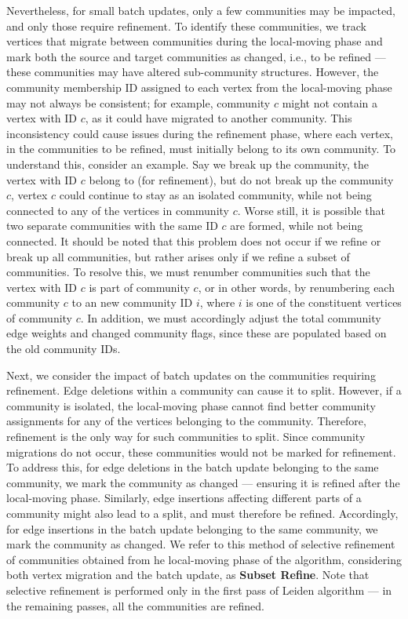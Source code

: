 Nevertheless, for small batch updates, only a few communities may be impacted, and only those require refinement. To identify these communities, we track vertices that migrate between communities during the local-moving phase and mark both the source and target communities as changed, i.e., to be refined --- these communities may have altered sub-community structures. However, the community membership ID assigned to each vertex from the local-moving phase may not always be consistent; for example, community $c$ might not contain a vertex with ID $c$, as it could have migrated to another community. This inconsistency could cause issues during the refinement phase, where each vertex, in the communities to be refined, must initially belong to its own community. To understand this, consider an example. Say we break up the community, the vertex with ID $c$ belong to (for refinement), but do not break up the community $c$, vertex $c$ could continue to stay as an isolated community, while not being connected to any of the vertices in community $c$. Worse still, it is possible that two separate communities with the same ID $c$ are formed, while not being connected. It should be noted that this problem does not occur if we refine or break up all communities, but rather arises only if we refine a subset of communities. To resolve this, we must renumber communities such that the vertex with ID $c$ is part of community $c$, or in other words, by renumbering each community $c$ to an new community ID $i$, where $i$ is one of the constituent vertices of community $c$. In addition, we must accordingly adjust the total community edge weights and changed community flags, since these are populated based on the old community IDs.

Next, we consider the impact of batch updates on the communities requiring refinement. Edge deletions within a community can cause it to split. However, if a community is isolated, the local-moving phase cannot find better community assignments for any of the vertices belonging to the community. Therefore, refinement is the only way for such communities to split. Since community migrations do not occur, these communities would not be marked for refinement. To address this, for edge deletions in the batch update belonging to the same community, we mark the community as changed --- ensuring it is refined after the local-moving phase. Similarly, edge insertions affecting different parts of a community might also lead to a split, and must therefore be refined. Accordingly, for edge insertions in the batch update belonging to the same community, we mark the community as changed. We refer to this method of selective refinement of communities obtained from he local-moving phase of the algorithm, considering both vertex migration and the batch update, as \textbf{Subset Refine}. Note that selective refinement is performed only in the first pass of Leiden algorithm --- in the remaining passes, all the communities are refined.

